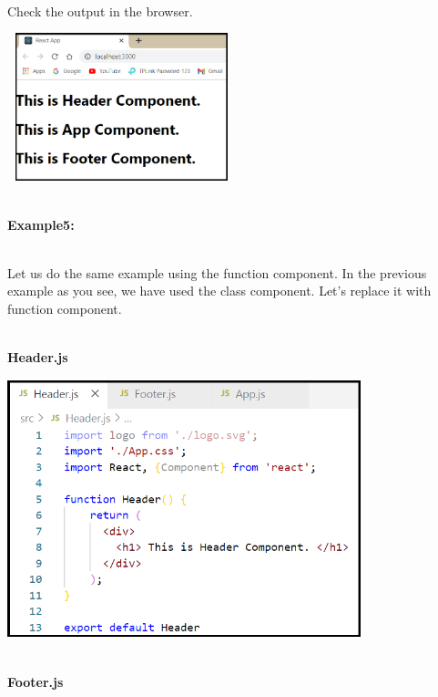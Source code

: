 \documentclass{article}
\begin{document}
\noindent 
\newpage
\noindent\\
 Check the output in the browser.

\begin{center}
	\noindent \includegraphics*[width=2.61in, height=1.69in]{IMG-07-23}
\end{center}

\noindent 

\noindent\\
 \textbf{Example5:}

\noindent\\
 Let us do the same example using the function component. In the previous example as you see, we have used the class component. Let's replace it with function component.

\noindent 

\noindent\\
 \textbf{Header.js}

\begin{center}
	\noindent \includegraphics*[width=4.04in, height=2.96in]{IMG-07-24}
\end{center}

\noindent 
\newpage
\noindent\\
 \textbf{Footer.js}
\end{document}
